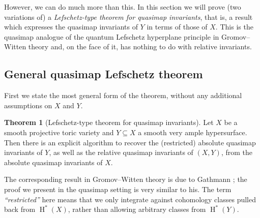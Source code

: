 \documentclass[11pt]{amsart}
\newcommand{\HH}{\operatorname{H}}
\theoremstyle{definition}
\newtheorem{thm}{Theorem}[section]
\theoremstyle{definition}
\begin{document}
However, we can do much more than this. In this section we will prove (two variations of) a \emph{Lefschetz-type theorem for quasimap invariants}, that is, a result which expresses the quasimap invariants of $Y$ in terms of those of $X$. This is the quasimap analogue of the quantum Lefschetz hyperplane principle in Gromov--Witten theory and, on the face of it, has nothing to do with relative invariants.

\subsection{General quasimap Lefschetz theorem}\label{Subsection general quasimap Lefschetz}
First we state the most general form of the theorem, without any additional assumptions on $X$ and $Y$.
\begin{thm}[Lefschetz-type theorem for quasimap invariants] \label{Theorem full quasimap Lefschetz} Let $X$ be a smooth projective toric variety and $Y \subseteq X$ a smooth very ample hypersurface. Then there is an explicit algorithm to recover the (restricted) absolute quasimap invariants of $Y$, as well as the relative quasimap invariants of $(X,Y)$, from the absolute quasimap invariants of $X$.\end{thm}
The corresponding result in Gromov--Witten theory is due to Gathmann \cite[Corollary 2.5.6]{GathmannThesis}; the proof we present in the quasimap setting is very similar to his. The term \emph{``restricted''} here means that we only integrate against cohomology classes pulled back from $\HH^*(X)$, rather than allowing arbitrary classes from $\HH^*(Y)$.
\end{document}
